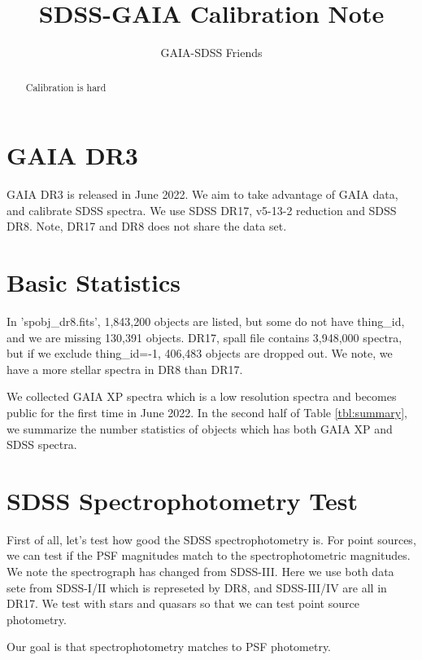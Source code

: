 \documentclass[apj,twocolumn]{aastex631}
\begin{document}
\title{SDSS-GAIA Calibration Note}
\author{GAIA-SDSS Friends}

\begin{abstract}
Calibration is hard
\end{abstract}


\section{GAIA DR3}
GAIA DR3 is released in June 2022.   We aim to take advantage of GAIA data, and calibrate SDSS spectra.  We use SDSS DR17, v5-13-2 reduction and SDSS DR8.  Note, DR17 and DR8 does not share the data set.

\section{Basic Statistics}
In 'spobj\_dr8.fits', 1,843,200 objects are listed, but some do not have thing\_id, and we are missing 130,391 objects.
DR17, spall file contains 3,948,000 spectra, but if we exclude thing\_id=-1, 406,483 objects are dropped out.
We note, we have a more stellar spectra in DR8 than DR17.

We collected GAIA XP spectra which is a low resolution spectra and becomes public for the first time in June 2022.  In the second half of Table \ref{tbl:summary}, we summarize the number statistics of objects which has both GAIA XP and SDSS spectra.

\section{SDSS Spectrophotometry Test}
First of all, let's test how good the SDSS spectrophotometry is.   For point sources, we can test if the PSF magnitudes match to the spectrophotometric magnitudes.
We note the spectrograph has changed from SDSS-III.   Here we use both data sete from SDSS-I/II which is represeted by DR8, and SDSS-III/IV are all in DR17.   We test with stars and quasars so that we can test point source photometry.

Our goal is that spectrophotometry matches to PSF photometry.   
\end{document}
